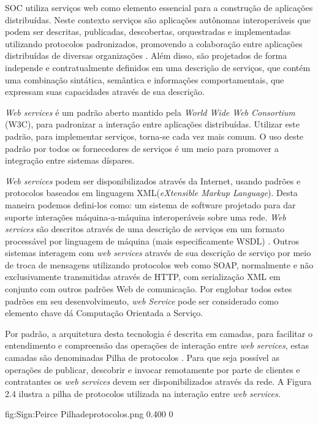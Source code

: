 SOC utiliza serviços web como elemento essencial para a construção de aplicações distribuídas. Neste contexto serviços são aplicações autônomas interoperáveis que podem ser descritas, publicadas, descobertas, orquestradas e implementadas utilizando protocolos padronizados, promovendo a colaboração entre aplicações distribuídas de diversas organizações \cite{Dustdar:2008}. Além disso, são projetados de forma independe e contratualmente definidos em uma descrição de serviços, que contém uma combinação sintática, semântica e informações comportamentais, que expressam suas capacidades através de sua descrição.

\textit{Web services} é um padrão aberto mantido pela \textit{World Wide Web Consortium} (W3C), para padronizar a interação entre aplicações distribuídas. Utilizar este padrão, para implementar serviços, torna-se cada vez mais comum. O uso deste padrão por todos os fornecedores de serviços é um meio para promover a integração entre sistemas díspares.

\textit{Web services} podem ser disponibilizados através da Internet, usando padrões e protocolos baseados em linguagem XML(\textit{eXtensible Markup Language}). Desta maneira podemos defini-los como: um sistema de software projetado para dar suporte interações máquina-a-máquina interoperáveis sobre uma rede. \textit{Web services} são descritos através de uma descrição de serviços em um formato processável por linguagem de máquina (mais especificamente WSDL) \cite{W3Cwebservice}. Outros sistemas interagem com \textit{web services} através de sua descrição de serviço por meio de troca de mensagens utilizando protocolos web como SOAP, normalmente e não exclusivamente transmitidas através de HTTP, com serialização XML em conjunto com outros padrões Web de comunicação. Por englobar todos estes padrões em seu desenvolvimento, \textit{web Service} pode ser considerado como elemento chave dá Computação Orientada a Serviço.

Por padrão, a arquitetura desta tecnologia é descrita em camadas, para facilitar o entendimento e compreensão das operações de interação entre \textit{web services}, estas camadas são denominadas Pilha de protocolos \cite{kreger2001services}. Para que seja possível as operações de publicar, descobrir e invocar remotamente por parte de clientes e contratantes os \textit{web services} devem ser disponibilizados através da rede. A Figura 2.4 ilustra a pilha de protocolos utilizada na interação entre \textit{web services}.

       {fig:Sign:Peirce}
       {Pilhadeprotocolos.png}
       {0.400}
       {0}

